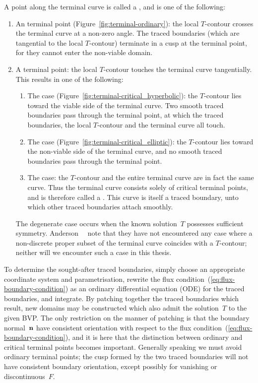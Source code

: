 A point along the terminal curve is called a ,
and is one of the following:
\begin{enumerate}
  \item
    An  terminal point
    (Figure~\ref{fig:terminal-ordinary}):
    the local $T$-contour crosses the terminal curve at a non-zero angle.
    The traced boundaries (which are tangential to the local $T$-contour)
    terminate in a cusp at the terminal point,
    for they cannot enter the non-viable domain.
  \item
    A  terminal point:
    the local $T$-contour touches the terminal curve tangentially.
    This results in one of the following:
    \begin{enumerate}
      \item
        The  case
        (Figure~\ref{fig:terminal-critical_hyperbolic}):
        the $T$-contour lies toward the viable side of the terminal curve.
        Two smooth traced boundaries pass through the terminal point,
        at which the traced boundaries,
        the local $T$-contour and the terminal curve
        all touch.
      \item
        The  case
        (Figure~\ref{fig:terminal-critical_elliptic}):
        the $T$-contour lies toward the non-viable side of the terminal curve,
        and no smooth traced boundaries pass through the terminal point.
      \item
        The  case:
        the $T$-contour and the entire terminal curve
        are in fact the same curve.
        Thus the terminal curve consists solely of critical terminal points,
        and is therefore called a .
        This curve is itself a traced boundary,
        unto which other traced boundaries attach smoothly.
    \end{enumerate}
    The degenerate case occurs
    when the known solution~$T$ possesses sufficient symmetry.
    Anderson~\etal~\cite{anderson-2007-boundary-tracing-i-theory}
    note that they have not encountered any case
    where a non-discrete proper subset of the terminal curve
    coincides with a $T$-contour;
    neither will we encounter such a case in this thesis.
\end{enumerate}

To determine the sought-after traced boundaries,
simply choose an appropriate coordinate system and parametrisation,
rewrite the flux condition~(\ref{eq:flux-boundary-condition})
as an ordinary differential equation (ODE) for the traced boundaries,
and integrate.
By patching together the traced boundaries which result,
new domains may be constructed
which also admit the solution~$T$ to the given BVP\@.
The only restriction on the manner of patching
is that the boundary normal~$\mathop{}\!\boldsymbol{\mathbf{n}}$ have consistent orientation
with respect to the flux condition~(\ref{eq:flux-boundary-condition}),
and it is here that
the distinction between ordinary and critical terminal points
becomes important.
Generally speaking we must avoid ordinary terminal points;
the cusp formed by the two traced boundaries
will not have consistent boundary orientation,
except possibly for vanishing or discontinuous~$F$.

